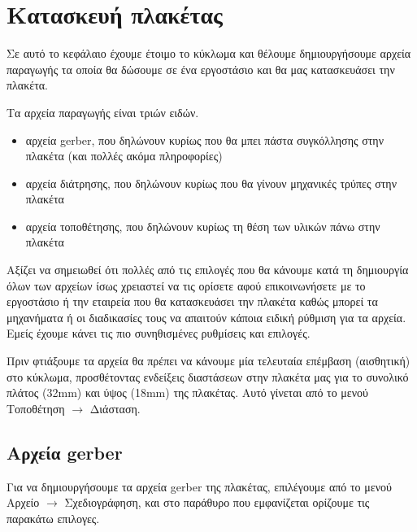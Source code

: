 \documentclass[a4paper]{article}
\begin{document}

\section{Κατασκευή πλακέτας}
Σε αυτό το κεφάλαιο έχουμε έτοιμο το κύκλωμα και θέλουμε δημιουργήσουμε αρχεία παραγωγής τα οποία θα δώσουμε σε ένα εργοστάσιο και θα μας κατασκευάσει την πλακέτα. 

Τα αρχεία παραγωγής είναι τριών ειδών.

\begin{itemize}
    \item αρχεία gerber, που δηλώνουν κυρίως που θα μπει πάστα συγκόλλησης στην πλακέτα (και πολλές ακόμα πληροφορίες)
    \item αρχεία διάτρησης, που δηλώνουν κυρίως που θα γίνουν μηχανικές τρύπες στην πλακέτα
    \item αρχεία τοποθέτησης, που δηλώνουν κυρίως τη θέση των υλικών πάνω στην πλακέτα
\end{itemize}

Αξίζει να σημειωθεί ότι πολλές από τις επιλογές που θα κάνουμε κατά τη δημιουργία όλων των αρχείων ίσως χρειαστεί να τις ορίσετε αφού επικοινωνήσετε με το εργοστάσιο ή την εταιρεία που θα κατασκευάσει την πλακέτα καθώς μπορεί τα μηχανήματα ή οι διαδικασίες τους να απαιτούν κάποια ειδική ρύθμιση για τα αρχεία. Εμείς έχουμε κάνει τις πιο συνηθισμένες ρυθμίσεις και επιλογές.

Πριν φτιάξουμε τα αρχεία θα πρέπει να κάνουμε μία τελευταία επέμβαση (αισθητική) στο κύκλωμα, προσθέτοντας ενδείξεις διαστάσεων στην πλακέτα μας για το συνολικό πλάτος (32mm) και ύψος (18mm) της πλακέτας. Αυτό γίνεται από το μενού Τοποθέτηση $\rightarrow$ Διάσταση.

\begin{figure}
  \begin{center}
    \label{fig:kicad-main}
  \end{center}
\end{figure}

\subsection{Αρχεία gerber}
Για να δημιουργήσουμε τα αρχεία gerber της πλακέτας, επιλέγουμε από το μενού Αρχείο $\rightarrow$ Σχεδιογράφηση, και στο παράθυρο που εμφανίζεται ορίζουμε τις παρακάτω επιλογες.
\end{document}
